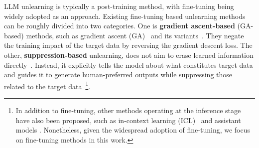 LLM unlearning is typically a post-training method, with fine-tuning being widely adopted as an approach.
Existing fine-tuning based unlearning methods can be roughly divided into two categories. 
One is \textbf{gradient ascent-based} ({GA-based}) methods, such as gradient ascent (GA)~\citep{jang2023knowledge, maini2024tofu} and its variants~\cite{yao2023large, liu2022continual, zhang2024negative, fan2024simplicity, veldanda2024llm, cha2024towards, liu2024towards, feng2024fine, bu2024unlearning, tian2024forget}. They negate the training impact of the target data by reversing the gradient descent loss. The other, \textbf{suppression-based} unlearning, does not aim to erase learned information directly~\cite{maini2024tofu, liwmdp, wang2024llm, huu2024effects, shi2024ulmr, liu2024towards, sinha2024unstar}. Instead, it explicitly tells the model about what constitutes target data and guides it to generate human-preferred outputs while suppressing those related to the target data~\footnote{{In addition to fine-tuning, other methods operating at the inference stage have also been proposed, such as in-context learning (ICL)~\cite{pawelczykcontext} and assistant models {\cite{huang2024offset}}. 
{Nonetheless, given the widespread adoption of fine-tuning, we focus on fine-tuning methods in this work.}
}}.


